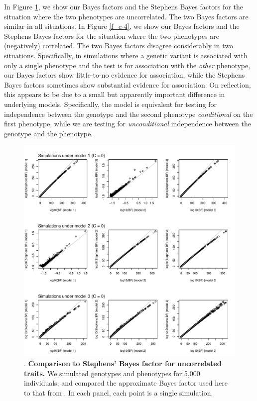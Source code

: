 \documentclass[11pt,titlepage]{article}
\begin{document}
In Figure \ref{f_c0}, we show our Bayes factors and the Stephens Bayes factors for the situation where the two phenotypes are uncorrelated. The two Bayes factors are similar in all situations. In Figure \ref{f_c-4}, we show our Bayes factors and the Stephens Bayes factors for the situation where the two phenotypes are (negatively) correlated. The two Bayes factors disagree considerably in two situations. Specifically, in simulations where a genetic variant is associated with only a single phenotype and the test is for association with the \emph{other} phenotype, our Bayes factors show little-to-no evidence for association, while the Stephens Bayes factors sometimes show substantial evidence for association. On reflection, this appears to be due to a small but apparently important difference in underlying models. Specifically, the \citet{Stephens:2013fk} model is equivalent for testing for independence between the genotype and the second phenotype \emph{conditional} on the first phenotype, while we are testing for \emph{unconditional} independence between the genotype and the phenotype.  

 
\begin{figure}
\begin{center}
\includegraphics[scale = 0.6]{figs/allc0.pdf}
\caption{. \textbf{Comparison to Stephens' Bayes factor for uncorrelated traits.} We simulated genotypes and phenotypes for 5,000 individuals, and compared the approximate Bayes factor used here to that from \citet{Stephens:2013fk}. In each panel, each point is a single simulation. }\label{f_c0}
\end{center}
\end{figure}
\end{document}
